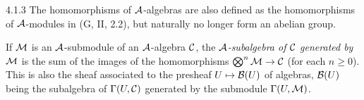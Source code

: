 \documentclass[../main.tex]{subfiles}
\begin{document}
\begin{env}{4.1.3}
The homomorphisms of $\mathcal{A}$-algebras are also defined as the homomorphisms of $\mathcal{A}$-modules
in (G, II, 2.2), but naturally no longer form an abelian group.

If $\mathcal{M}$ is an $\mathcal{A}$-submodule of an $\mathcal{A}$-algebra $\mathcal{C}$, the
\emph{$\mathcal{A}$-subalgebra of $\mathcal{C}$ generated by $\mathcal{M}$} is the sum of the images
of the homomorphisms $\bigotimes^n\mathcal{M}\to\mathcal{C}$ (for each $n\geq 0$). This is also the sheaf
associated to the presheaf $U\mapsto\mathcal{B}(U)$ of algebras, $\mathcal{B}(U)$ being the subalgebra
of $\Gamma(U,\mathcal{C})$ generated by the submodule $\Gamma(U,\mathcal{M})$.
\end{env}

\end{document}
